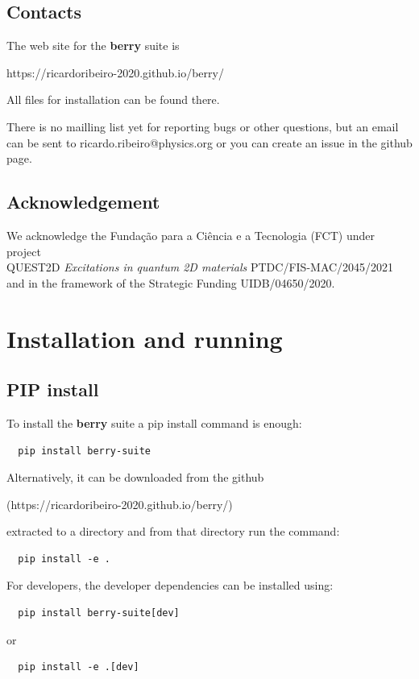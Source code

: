 \documentclass[a4paper,12pt]{report}
\begin{document}
\section{Contacts}

The web site for the \textbf{berry} suite is\medskip

https://ricardoribeiro-2020.github.io/berry/\medskip

All files for installation can be found there.

There is no mailling list yet for reporting bugs or other questions, but an email can be sent to
ricardo.ribeiro@physics.org or you can create an issue in the github page.

\section{Acknowledgement}

We acknowledge the Fundação para a Ciência e a Tecnologia (FCT)
under project \\ QUEST2D \emph{Excitations in quantum 2D materials}
PTDC/FIS-MAC/2045/2021 \\
and in the framework of the Strategic Funding UIDB/04650/2020.






\chapter{Installation and running}

\section{PIP install}

To install the \textbf{berry} suite a pip install command is enough:
\begin{verbatim}
  pip install berry-suite
\end{verbatim}

Alternatively, it can be downloaded from the github

(https://ricardoribeiro-2020.github.io/berry/)

extracted to a directory and from that directory run the command:
\begin{verbatim}
  pip install -e .
\end{verbatim}

For developers, the developer dependencies can be installed using:
\begin{verbatim}
  pip install berry-suite[dev]
\end{verbatim}
or
\begin{verbatim}
  pip install -e .[dev]
\end{verbatim}
\end{document}
